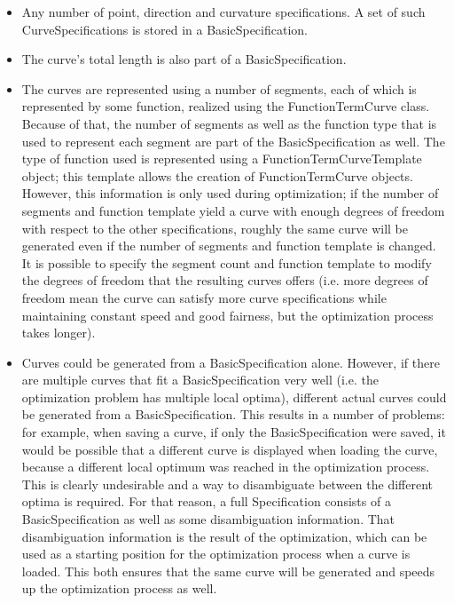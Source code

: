 \documentclass[a4paper]{article}
\begin{document}
				\begin{itemize}
					\item Any number of point, direction and curvature specifications. A set of such CurveSpecifications is stored in a BasicSpecification.
					\item The curve's total length is also part of a BasicSpecification.
					\item The curves are represented using a number of segments, each of which is represented by some function, realized using the FunctionTermCurve class. Because of that, the number of segments as well as the function type that is used to represent each segment are part of the BasicSpecification as well. 
					The type of function used is represented using a FunctionTermCurveTemplate object; this template allows the creation of FunctionTermCurve objects.  
					However, this information is only used during optimization; if the number of segments and function template yield a curve with enough degrees of freedom with respect to the other specifications, roughly the same curve will be generated even if the number of segments and function template is changed. It is possible to specify the segment count and function template to modify the degrees of freedom that the resulting curves offers (i.e. more degrees of freedom mean the curve can satisfy more curve specifications while maintaining constant speed and good fairness, but the optimization process takes longer).
					\item Curves could be generated from a BasicSpecification alone. However, if there are multiple curves that fit a BasicSpecification very well (i.e. the optimization problem has multiple local optima), different actual curves could be generated from a BasicSpecification. This results in a number of problems: for example, when saving a curve, if only the BasicSpecification were saved, it would be possible that a different curve is displayed when loading the curve, because a different local optimum was reached in the optimization process. This is clearly undesirable and a way to disambiguate between the different optima is required. 
					For that reason, a full Specification consists of a BasicSpecification as well as some disambiguation information. That disambiguation information is the result of the optimization, which can be used as a starting position for the optimization process when a curve is loaded. This both ensures that the same curve will be generated and speeds up the optimization process as well.
				\end{itemize}
				
\end{document}
